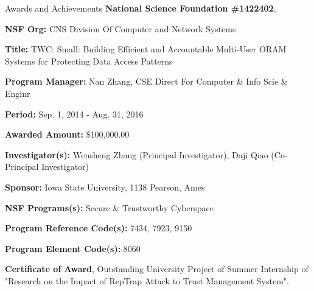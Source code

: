 \begin{rubric}{Awards and Achievements}
\entry*[2014] \textbf{National Science Foundation \#1422402}, 

\par{\textbf{NSF Org:} CNS Division Of Computer and Network Systems}

\par{\textbf{Title:} TWC: Small: Building Efficient and Accountable Multi-User ORAM Systems for Protecting Data Access Patterns}

\par{\textbf{Program Manager:} Nan Zhang, CSE Direct For Computer \& Info Scie \& Enginr}

\par{\textbf{Period:} Sep. 1, 2014 - Aug. 31, 2016}

\par{\textbf{Awarded Amount:} \$100,000.00}

\par{\textbf{Investigator(s):} Wensheng Zhang (Principal Investigator), Daji Qiao (Co-Principal Investigator)}

\par{\textbf{Sponsor:} Iowa State University, 1138 Pearson, Ames}

\par{\textbf{NSF Programs(s):} Secure \& Trustworthy Cyberspace}

\par{\textbf{Program Reference Code(s):} 7434, 7923, 9150}

\par{\textbf{Program Element Code(s):} 8060}

\entry*[2009] \textbf{Certificate of Award}, Outstanding University Project of Summer Internship of "Research on the Impact of RepTrap Attack to Trust Management System".
\end{rubric}